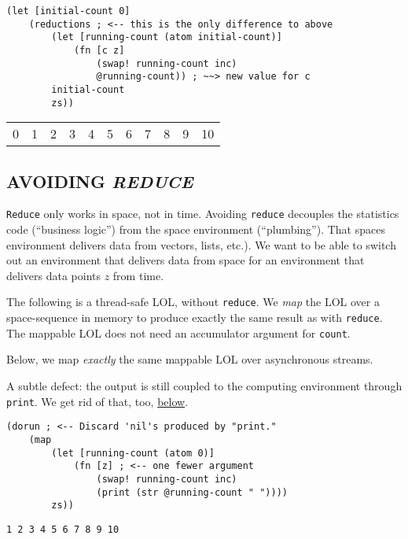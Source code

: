 \documentclass[10pt,oneside,x11names]{article}
\begin{document}
\begin{verbatim}
(let [initial-count 0]
    (reductions ; <-- this is the only difference to above
        (let [running-count (atom initial-count)]
            (fn [c z]
                (swap! running-count inc)
                @running-count)) ; ~~> new value for c
        initial-count
        zs))
\end{verbatim}

\begin{center}
\begin{tabular}{rrrrrrrrrrr}
0 & 1 & 2 & 3 & 4 & 5 & 6 & 7 & 8 & 9 & 10\\
\end{tabular}
\end{center}

\subsection{AVOIDING \emph{REDUCE}}
\label{avoiding-reduce}
\texttt{Reduce} only works in space, not in time. Avoiding \texttt{reduce} decouples
the statistics code (``business logic'') from the space environment
(``plumbing''). That spaces environment delivers data from vectors, lists,
etc.). We want to be able to switch out an environment that delivers
data from space for an environment that delivers data points \(z\) from
time.

The following is a thread-safe LOL, without \texttt{reduce}. We \emph{map} the LOL
over a space-sequence in memory to produce exactly the same result as
with \texttt{reduce}. The mappable LOL does not need an accumulator argument
for \texttt{count}.

Below, we map \emph{exactly} the same mappable LOL over asynchronous streams.

A subtle defect: the output is still coupled to the computing
environment through \texttt{print}. We get rid of that, too,
\hyperref[REMOVING-OUTPUT-COUPLING]{below}.

\begin{verbatim}
(dorun ; <-- Discard 'nil's produced by "print."
    (map
        (let [running-count (atom 0)]
            (fn [z] ; <-- one fewer argument
                (swap! running-count inc)
                (print (str @running-count " "))))
        zs))
\end{verbatim}

\begin{verbatim}
1 2 3 4 5 6 7 8 9 10
\end{verbatim}
\end{document}
